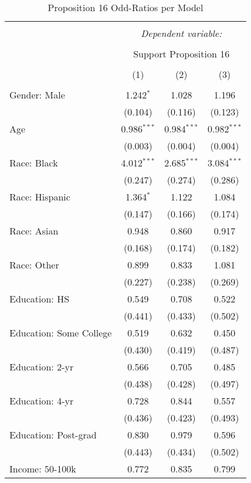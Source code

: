 
\begin{table}[!htbp] \centering 
  \caption{Proposition 16 Odd-Ratios per Model} 
  \label{} 
\footnotesize 
\begin{tabular}{@{\extracolsep{5pt}}lccc} 
\\[-1.8ex]\hline 
\hline \\[-1.8ex] 
 & \multicolumn{3}{c}{\textit{Dependent variable:}} \\ 
\cline{2-4} 
\\[-1.8ex] & \multicolumn{3}{c}{Support Proposition 16} \\ 
\\[-1.8ex] & (1) & (2) & (3)\\ 
\hline \\[-1.8ex] 
 Gender: Male & 1.242$^{*}$ & 1.028 & 1.196 \\ 
  & (0.104) & (0.116) & (0.123) \\ 
  Age & 0.986$^{***}$ & 0.984$^{***}$ & 0.982$^{***}$ \\ 
  & (0.003) & (0.004) & (0.004) \\ 
  Race: Black & 4.012$^{***}$ & 2.685$^{***}$ & 3.084$^{***}$ \\ 
  & (0.247) & (0.274) & (0.286) \\ 
  Race: Hispanic & 1.364$^{*}$ & 1.122 & 1.084 \\ 
  & (0.147) & (0.166) & (0.174) \\ 
  Race: Asian & 0.948 & 0.860 & 0.917 \\ 
  & (0.168) & (0.174) & (0.182) \\ 
  Race: Other & 0.899 & 0.833 & 1.081 \\ 
  & (0.227) & (0.238) & (0.269) \\ 
  Education: HS & 0.549 & 0.708 & 0.522 \\ 
  & (0.441) & (0.433) & (0.502) \\ 
  Education: Some College & 0.519 & 0.632 & 0.450 \\ 
  & (0.430) & (0.419) & (0.487) \\ 
  Education: 2-yr & 0.566 & 0.705 & 0.485 \\ 
  & (0.438) & (0.428) & (0.497) \\ 
  Education: 4-yr & 0.728 & 0.844 & 0.557 \\ 
  & (0.436) & (0.423) & (0.493) \\ 
  Education: Post-grad & 0.830 & 0.979 & 0.596 \\ 
  & (0.443) & (0.434) & (0.502) \\ 
  Income: 50-100k & 0.772 & 0.835 & 0.799 \\ 

\end{tabular}
\end{table}
